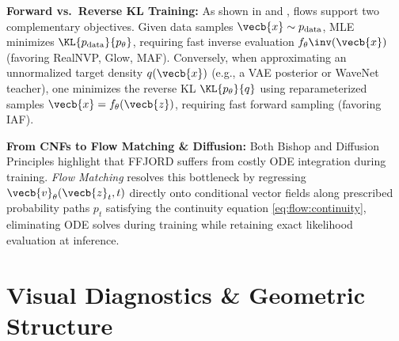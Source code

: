 \documentclass[../../../../master.tex]{subfiles}
\begin{document}
\begin{crossbook}
\textbf{Forward vs.\ Reverse KL Training:} As shown in  and , flows support two complementary objectives. Given data samples $\vecb{x} \sim p_{\mathrm{data}}$, MLE minimizes $\KL{p_{\mathrm{data}}}{p_\theta}$, requiring fast inverse evaluation $f_\theta\inv(\vecb{x})$ (favoring RealNVP, Glow, MAF). Conversely, when approximating an unnormalized target density $q(\vecb{x})$ (e.g., a VAE posterior or WaveNet teacher), one minimizes the reverse KL $\KL{p_\theta}{q}$ using reparameterized samples $\vecb{x} = f_\theta(\vecb{z})$, requiring fast forward sampling (favoring IAF).

\textbf{From CNFs to Flow Matching \& Diffusion:} Both Bishop  and Diffusion Principles  highlight that FFJORD suffers from costly ODE integration during training. \emph{Flow Matching} resolves this bottleneck by regressing $\vecb{v}_\theta(\vecb{z}_t, t)$ directly onto conditional vector fields along prescribed probability paths $p_t$ satisfying the continuity equation \eqref{eq:flow:continuity}, eliminating ODE solves during training while retaining exact likelihood evaluation at inference.
\end{crossbook}

\section{Visual Diagnostics \& Geometric Structure}\label{sec:flow:visuals}
\end{document}
